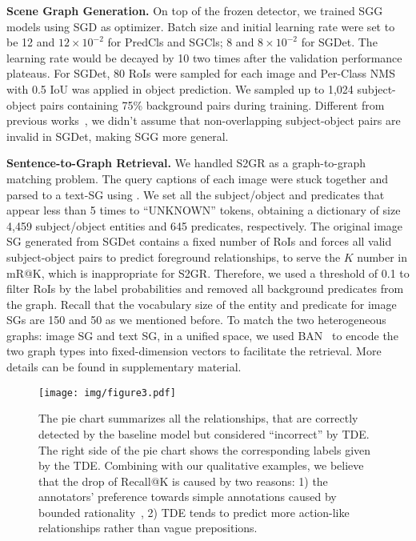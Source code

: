\documentclass[10pt,twocolumn,letterpaper]{article}
\begin{document}
\noindent\textbf{Scene Graph Generation.} On top of the frozen detector, we trained SGG models using SGD as optimizer. Batch size and initial learning rate were set to be 12 and $12\times 10^{-2}$ for PredCls and SGCls; 8 and $8\times 10^{-2}$ for SGDet. The learning rate would be decayed by 10 two times after the validation performance plateaus. For SGDet, 80 RoIs were sampled for each image and Per-Class NMS~\cite{rosenfeld1971edge, zellers2018neural} with 0.5 IoU was applied in object prediction. We sampled up to 1,024 subject-object pairs containing 75\% background pairs during training. Different from previous works~\cite{zellers2018neural, tang2019learning, chen2019counterfactual}, we didn't assume that non-overlapping subject-object pairs are invalid in SGDet, making SGG more general.


\noindent\textbf{Sentence-to-Graph Retrieval.} We handled S2GR as a graph-to-graph matching problem. The query captions of each image were stuck together and parsed to a text-SG using \cite{schuster2015generating}. We set all the subject/object and predicates that appear less than 5 times to ``UNKNOWN'' tokens, obtaining a dictionary of size 4,459 subject/object entities and 645 predicates, respectively. The original image SG generated from SGDet contains a fixed number of RoIs and forces all valid subject-object pairs to predict foreground relationships, to serve the $K$ number in mR@K, which is inappropriate for S2GR. Therefore, we used a threshold of 0.1 to filter RoIs by the label probabilities and removed all background predicates from the graph. Recall that the vocabulary size of the entity and predicate for image SGs are 150 and 50 as we mentioned before. To match the two heterogeneous graphs: image SG and text SG, in a unified space, we used BAN~\cite{kim2018bilinear} to encode the two graph types into fixed-dimension vectors to facilitate the retrieval. More details can be found in supplementary material.


\begin{figure}[t]
   \begin{minipage}[b]{1.0\linewidth}
   \centerline{\texttt{[image: img/figure3.pdf]}}
   \end{minipage}
   \caption{The pie chart summarizes all the relationships, that are correctly detected by the baseline model but considered ``incorrect'' by TDE.  The right side of the pie chart shows the corresponding labels given by the TDE. Combining with our qualitative examples, we believe that the drop of Recall@K is caused by two reasons: 1) the annotators’ preference towards simple annotations caused by bounded rationality~\cite{simon1990bounded}, 2) TDE tends to predict more action-like relationships rather than vague prepositions.}
   \label{fig:5} \vspace{-0.2in}
\end{figure}
\end{document}
